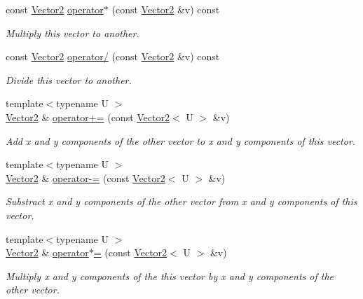 \begin{DoxyCompactItemize}
const \hyperlink{classfuzzy_telegram_1_1_vector2}{Vector2} \hyperlink{classfuzzy_telegram_1_1_vector2_a9649faaaf04d1baa4de899d03aac4bd9}{operator$\ast$} (const \hyperlink{classfuzzy_telegram_1_1_vector2}{Vector2} \&v) const 
\begin{DoxyCompactList}\small\item\em Multiply this vector to another. \end{DoxyCompactList}\item 
const \hyperlink{classfuzzy_telegram_1_1_vector2}{Vector2} \hyperlink{classfuzzy_telegram_1_1_vector2_a0d4c54736eb4a92fde2937699d472592}{operator/} (const \hyperlink{classfuzzy_telegram_1_1_vector2}{Vector2} \&v) const 
\begin{DoxyCompactList}\small\item\em Divide this vector to another. \end{DoxyCompactList}\item 
{\footnotesize template$<$typename U $>$ }\\\hyperlink{classfuzzy_telegram_1_1_vector2}{Vector2} \& \hyperlink{classfuzzy_telegram_1_1_vector2_a73a402eb83722b01419857d1a0d06fb2}{operator+=} (const \hyperlink{classfuzzy_telegram_1_1_vector2}{Vector2}$<$ U $>$ \&v)
\begin{DoxyCompactList}\small\item\em Add x and y components of the other vector to x and y components of this vector. \end{DoxyCompactList}\item 
{\footnotesize template$<$typename U $>$ }\\\hyperlink{classfuzzy_telegram_1_1_vector2}{Vector2} \& \hyperlink{classfuzzy_telegram_1_1_vector2_a5aeb8497975097a33cebda7485f23abc}{operator-\/=} (const \hyperlink{classfuzzy_telegram_1_1_vector2}{Vector2}$<$ U $>$ \&v)
\begin{DoxyCompactList}\small\item\em Substract x and y components of the other vector from x and y components of this vector. \end{DoxyCompactList}\item 
{\footnotesize template$<$typename U $>$ }\\\hyperlink{classfuzzy_telegram_1_1_vector2}{Vector2} \& \hyperlink{classfuzzy_telegram_1_1_vector2_af5efbd8d8858e8d1d4bf051f1a52280d}{operator$\ast$=} (const \hyperlink{classfuzzy_telegram_1_1_vector2}{Vector2}$<$ U $>$ \&v)
\begin{DoxyCompactList}\small\item\em Multiply x and y components of the this vector by x and y components of the other vector. \end{DoxyCompactList}\item 

\end{DoxyCompactItemize}
